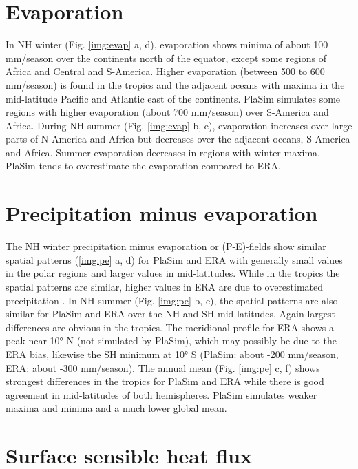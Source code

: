 \documentclass[12pt,a4paper,twoside,openright,headinclude,liststotoc,bibtotoc]{scrreprt}
\begin{document}
\vspace{-0.4cm}
\section{Evaporation}
\vspace{-0.4cm}

In NH winter (Fig. \ref{img:evap} a, d), evaporation shows minima of about 100 mm/season over the continents north of the equator, except some regions of Africa and Central and S-America. Higher evaporation (between 500 to 600 mm/season) is found in the tropics and the adjacent oceans with maxima in the mid-latitude Pacific and Atlantic east of the continents. PlaSim simulates some regions with higher evaporation (about 700 mm/season) over S-America and Africa. During NH summer (Fig. \ref{img:evap} b, e), evaporation increases over large parts of N-America and Africa but decreases over the adjacent oceans, S-America and Africa. Summer evaporation decreases in regions with winter maxima. PlaSim tends to overestimate the evaporation compared to ERA.

\vspace{-0.4cm}
\section{Precipitation minus evaporation}
\vspace{-0.4cm}

The NH winter precipitation minus evaporation or (P-E)-fields show similar spatial patterns (\ref{img:pe} a, d) for PlaSim and ERA with generally small values in the polar regions and larger values in mid-latitudes. While in the tropics the spatial patterns are similar, higher values in ERA are due to overestimated precipitation \citep{Hagemann2005}. In NH summer (Fig. \ref{img:pe} b, e), the spatial patterns are also similar for PlaSim and ERA over the NH and SH mid-latitudes. Again largest differences are obvious in the tropics. The meridional profile for ERA shows a peak near 10° N (not simulated by PlaSim), which may possibly be due to the ERA bias, likewise the SH minimum at 10° S (PlaSim: about -200 mm/season, ERA: about -300 mm/season). The annual mean (Fig. \ref{img:pe} c, f) shows strongest differences in the tropics for PlaSim and ERA while there is good agreement in mid-latitudes of both hemispheres. PlaSim simulates weaker maxima and minima and a much lower global mean. 

\vspace{-0.4cm}
\section{Surface sensible heat flux}
\vspace{-0.4cm}
\end{document}
